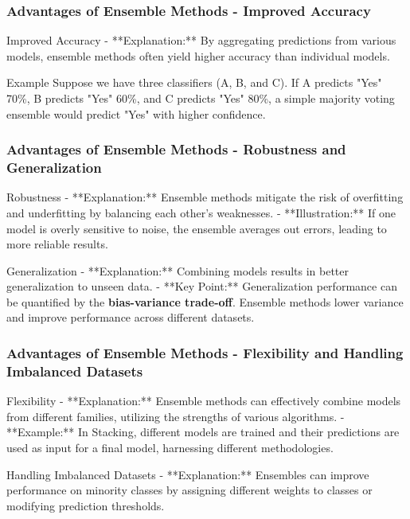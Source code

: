\documentclass[aspectratio=169]{beamer}
\begin{document}
\begin{frame}[fragile]
    \frametitle{Advantages of Ensemble Methods - Improved Accuracy}
    \begin{block}{Improved Accuracy}
        - **Explanation:** By aggregating predictions from various models, ensemble methods often yield higher accuracy than individual models.
    \end{block}

    \begin{exampleblock}{Example}
        Suppose we have three classifiers (A, B, and C). If A predicts "Yes" 70\%, B predicts "Yes" 60\%, and C predicts "Yes" 80\%, a simple majority voting ensemble would predict "Yes" with higher confidence.
    \end{exampleblock}
\end{frame}

\begin{frame}[fragile]
    \frametitle{Advantages of Ensemble Methods - Robustness and Generalization}
    \begin{block}{Robustness}
        - **Explanation:** Ensemble methods mitigate the risk of overfitting and underfitting by balancing each other's weaknesses.
        - **Illustration:** If one model is overly sensitive to noise, the ensemble averages out errors, leading to more reliable results.
    \end{block}
    
    \begin{block}{Generalization}
        - **Explanation:** Combining models results in better generalization to unseen data.
        - **Key Point:** Generalization performance can be quantified by the \textbf{bias-variance trade-off}. Ensemble methods lower variance and improve performance across different datasets.
    \end{block}
\end{frame}

\begin{frame}[fragile]
    \frametitle{Advantages of Ensemble Methods - Flexibility and Handling Imbalanced Datasets}
    \begin{block}{Flexibility}
        - **Explanation:** Ensemble methods can effectively combine models from different families, utilizing the strengths of various algorithms.
        - **Example:** In Stacking, different models are trained and their predictions are used as input for a final model, harnessing different methodologies.
    \end{block}
    
    \begin{block}{Handling Imbalanced Datasets}
        - **Explanation:** Ensembles can improve performance on minority classes by assigning different weights to classes or modifying prediction thresholds.
    \end{block}
\end{frame}
\end{document}
